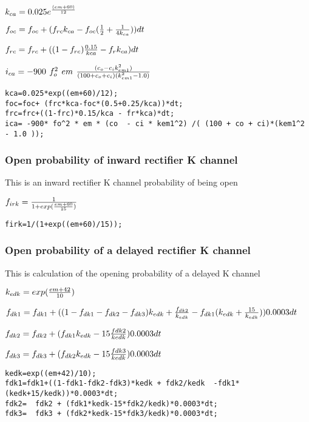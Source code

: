 \documentclass[11pt]{article}
\begin{document}
    \(\large{k_{ca} = 0.025 e^{\frac{(em+60)}{12}}}\)

\(\large{f_{oc} = f_{oc} +(f_{rc} k_{ca}-f_{oc}(\frac{1}{2}+\frac{1}{4 k_{ca}}))dt}\)

\(\large{f_{rc} = f_{rc} +((1-f_{rc})\frac{0.15}{k{ca}}-f_{r}k_{ca})dt}\)

\(\large{i_{ca} = -900~f_o^{2}~em~\frac{(c_o-c_ik_{em1}^2)}{(100+c_o+c_i)(k_{em1}^2-1.0)}}\)

    \begin{verbatim}
kca=0.025*exp((em+60)/12);
foc=foc+ (frc*kca-foc*(0.5+0.25/kca))*dt;
frc=frc+((1-frc)*0.15/kca - fr*kca)*dt;
ica= -900* fo^2 * em * (co  - ci * kem1^2) /( (100 + co + ci)*(kem1^2 - 1.0 ));
\end{verbatim}

    \subsubsection{Open probability of inward rectifier K
channel}\label{open-probability-of-inward-rectifier-k-channel}

This is an inward rectifier K channel probability of being open

    \(\large{f_{irk}} = \frac{1}{1+exp(\frac{em+60}{15})}\)

    \begin{verbatim}
firk=1/(1+exp((em+60)/15));
\end{verbatim}

    \subsubsection{Open probability of a delayed rectifier K
channel}\label{open-probability-of-a-delayed-rectifier-k-channel}

This is calculation of the opening probability of a delayed K channel

    \(\large k_{edk} = exp(\frac{em+42}{10})\)

\(\large f_{dk1} = f_{dk1}+ ((1-f_{dk1}-f_{dk2}-f_{dk3}) k_{edk}+\frac{f_{dk2}}{k_{edk}}-f_{dk1}(k_{edk}+\frac{15}{k_{edk}})) 0.0003dt\)

\(\large f_{dk2} = f_{dk2}+(f_{dk1} k_{edk} - 15 \frac{f{dk2}}{kedk}) 0.0003 dt\)

\(\large f_{dk3} = f_{dk3}+ (f_{dk2} k_{edk}-15 \frac{f{dk3}}{k{edk}}) 0.0003dt\)

    \begin{verbatim}
kedk=exp((em+42)/10);
fdk1=fdk1+((1-fdk1-fdk2-fdk3)*kedk + fdk2/kedk  -fdk1*(kedk+15/kedk))*0.0003*dt;
fdk2=  fdk2 + (fdk1*kedk-15*fdk2/kedk)*0.0003*dt;
fdk3=  fdk3 + (fdk2*kedk-15*fdk3/kedk)*0.0003*dt;
\end{verbatim}
\end{document}
